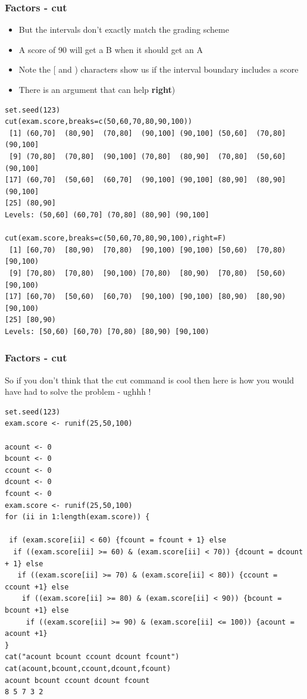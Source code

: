 \documentclass{beamer}
\begin{document}
%

\begin{frame}[fragile]
\frametitle{Factors - cut}
\begin{itemize}
\item But the intervals don't exactly match the grading scheme
\item A score of 90 will get a B when it should get an A
\item Note the [ and ) characters show us if the interval boundary includes a score
\item There is an argument that can help \textbf{right}) 
\end{itemize}
\scriptsize
\begin{verbatim}
set.seed(123)
cut(exam.score,breaks=c(50,60,70,80,90,100))
 [1] (60,70]  (80,90]  (70,80]  (90,100] (90,100] (50,60]  (70,80]  (90,100]
 [9] (70,80]  (70,80]  (90,100] (70,80]  (80,90]  (70,80]  (50,60]  (90,100]
[17] (60,70]  (50,60]  (60,70]  (90,100] (90,100] (80,90]  (80,90]  (90,100]
[25] (80,90] 
Levels: (50,60] (60,70] (70,80] (80,90] (90,100]

cut(exam.score,breaks=c(50,60,70,80,90,100),right=F)
 [1] [60,70)  [80,90)  [70,80)  [90,100) [90,100) [50,60)  [70,80)  [90,100)
 [9] [70,80)  [70,80)  [90,100) [70,80)  [80,90)  [70,80)  [50,60)  [90,100)
[17] [60,70)  [50,60)  [60,70)  [90,100) [90,100) [80,90)  [80,90)  [90,100)
[25] [80,90) 
Levels: [50,60) [60,70) [70,80) [80,90) [90,100)

\end{verbatim}
\end{frame}

%

\begin{frame}[fragile]
\frametitle{Factors - cut}
So if you don't think that the cut command is cool then here is how 
you would have had to solve the problem - ughhh !
\scriptsize
\begin{verbatim}
set.seed(123)
exam.score <- runif(25,50,100)

acount <- 0
bcount <- 0
ccount <- 0
dcount <- 0
fcount <- 0
exam.score <- runif(25,50,100)
for (ii in 1:length(exam.score)) {
  
 if (exam.score[ii] < 60) {fcount = fcount + 1} else
  if ((exam.score[ii] >= 60) & (exam.score[ii] < 70)) {dcount = dcount + 1} else
   if ((exam.score[ii] >= 70) & (exam.score[ii] < 80)) {ccount = ccount +1} else
    if ((exam.score[ii] >= 80) & (exam.score[ii] < 90)) {bcount = bcount +1} else
     if ((exam.score[ii] >= 90) & (exam.score[ii] <= 100)) {acount = acount +1}
}
cat("acount bcount ccount dcount fcount")
cat(acount,bcount,ccount,dcount,fcount)
acount bcount ccount dcount fcount
8 5 7 3 2

\end{verbatim}
\end{frame}
\end{document}
